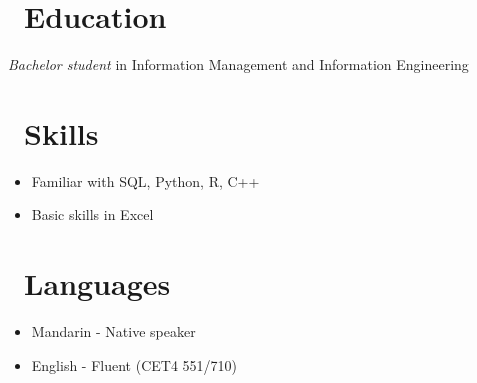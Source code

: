 \documentclass{resume}
\begin{document}



\section{\faGraduationCap\ Education}
\textit{Bachelor student} in Information Management and Information Engineering

\section{\faCogs\ Skills}
\begin{itemize}[parsep=0.5ex]
  \item Familiar with SQL, Python, R, C++
  \item Basic skills in Excel
\end{itemize}

\section{\faInfo\ Languages}
\begin{itemize}[parsep=0.5ex]
  \item Mandarin - Native speaker
  \item English - Fluent (CET4 551/710)
\end{itemize}

%
%
\end{document}
